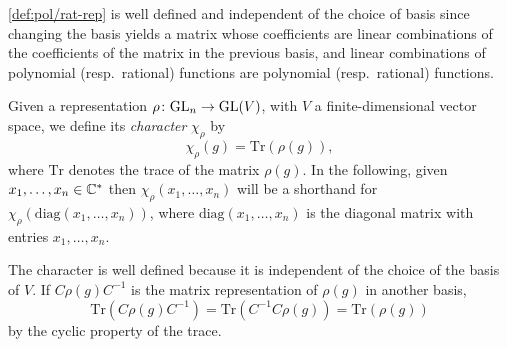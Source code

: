 \documentclass[11pt]{amsart}
\begin{document}
\begin{rem}
    \cref{def:pol/rat-rep} is well defined and independent of the choice of basis since changing the basis yields a matrix whose coefficients are linear combinations of the coefficients of the matrix in the previous basis, and linear combinations of polynomial (resp.\ rational) functions are polynomial (resp.\ rational) functions. 
\end{rem}

\begin{defin}\label{def:char}
    Given a representation \(\rho\colon \mathrm{GL}_n \rightarrow \mathrm{GL}(V)\), with $V$ a finite-dimensional vector space, we define its \emph{character} \(\chi_\rho\) by
    \[
    \chi_\rho (g) = \mathrm{Tr}(\rho (g)),
    \]
    where \(\mathrm{Tr}\) denotes the trace of the matrix $\rho(g)$. In the following, given \(x_1,\dots,x_n \in \mathbb{C}^\ast\) then \(\chi_\rho (x_1,\dots,x_n)\) will be a shorthand for \(\chi_\rho (\mathrm{diag}(x_1,\dots,x_n))\), where \(\mathrm{diag}(x_1,\dots,x_n)\) is the diagonal matrix with entries \(x_1,\dots,x_n\).
\end{defin}

\begin{rem}
    The character is well defined because it is independent of the choice of the basis of $V$. If $C \rho(g) C^{-1}$ is the matrix representation of $\rho(g)$ in another basis, \[\mathrm{Tr}(C \rho(g) C^{-1})=\mathrm{Tr}(C^{-1} C \rho(g))=\mathrm{Tr}(\rho(g))\] by the cyclic property of the trace. 
\end{rem}
\end{document}
